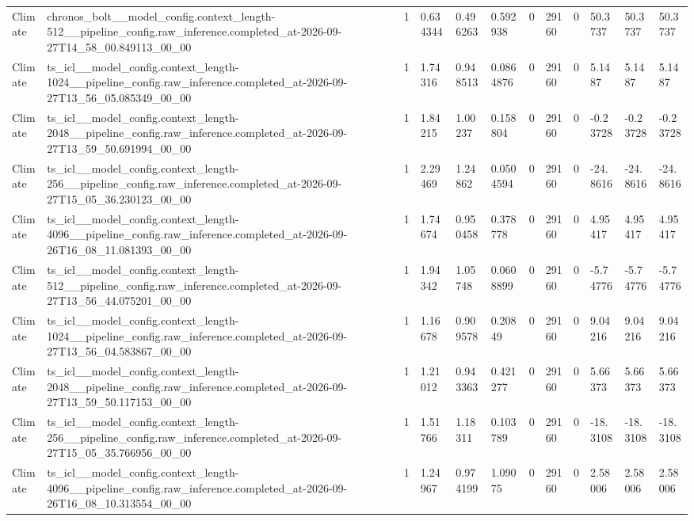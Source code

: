 \begin{tabular}{llllllllllll}
Climate & chronos\_bolt\_\_model\_config.context\_length-512\_\_pipeline\_config.raw\_inference.completed\_at-2026-09-27T14\_58\_00.849113\_00\_00 & 1 & 0.634344 & 0.496263 & 0.592938 & 0 & 29160 & 0 & 50.3737 & 50.3737 & 50.3737 \\
Climate & ts\_icl\_\_model\_config.context\_length-1024\_\_pipeline\_config.raw\_inference.completed\_at-2026-09-27T13\_56\_05.085349\_00\_00 & 1 & 1.74316 & 0.948513 & 0.0864876 & 0 & 29160 & 0 & 5.1487 & 5.1487 & 5.1487 \\
Climate & ts\_icl\_\_model\_config.context\_length-2048\_\_pipeline\_config.raw\_inference.completed\_at-2026-09-27T13\_59\_50.691994\_00\_00 & 1 & 1.84215 & 1.00237 & 0.158804 & 0 & 29160 & 0 & -0.23728 & -0.23728 & -0.23728 \\
Climate & ts\_icl\_\_model\_config.context\_length-256\_\_pipeline\_config.raw\_inference.completed\_at-2026-09-27T15\_05\_36.230123\_00\_00 & 1 & 2.29469 & 1.24862 & 0.0504594 & 0 & 29160 & 0 & -24.8616 & -24.8616 & -24.8616 \\
Climate & ts\_icl\_\_model\_config.context\_length-4096\_\_pipeline\_config.raw\_inference.completed\_at-2026-09-26T16\_08\_11.081393\_00\_00 & 1 & 1.74674 & 0.950458 & 0.378778 & 0 & 29160 & 0 & 4.95417 & 4.95417 & 4.95417 \\
Climate & ts\_icl\_\_model\_config.context\_length-512\_\_pipeline\_config.raw\_inference.completed\_at-2026-09-27T13\_56\_44.075201\_00\_00 & 1 & 1.94342 & 1.05748 & 0.0608899 & 0 & 29160 & 0 & -5.74776 & -5.74776 & -5.74776 \\
Climate & ts\_icl\_\_model\_config.context\_length-1024\_\_pipeline\_config.raw\_inference.completed\_at-2026-09-27T13\_56\_04.583867\_00\_00 & 1 & 1.16678 & 0.909578 & 0.20849 & 0 & 29160 & 0 & 9.04216 & 9.04216 & 9.04216 \\
Climate & ts\_icl\_\_model\_config.context\_length-2048\_\_pipeline\_config.raw\_inference.completed\_at-2026-09-27T13\_59\_50.117153\_00\_00 & 1 & 1.21012 & 0.943363 & 0.421277 & 0 & 29160 & 0 & 5.66373 & 5.66373 & 5.66373 \\
Climate & ts\_icl\_\_model\_config.context\_length-256\_\_pipeline\_config.raw\_inference.completed\_at-2026-09-27T15\_05\_35.766956\_00\_00 & 1 & 1.51766 & 1.18311 & 0.103789 & 0 & 29160 & 0 & -18.3108 & -18.3108 & -18.3108 \\
Climate & ts\_icl\_\_model\_config.context\_length-4096\_\_pipeline\_config.raw\_inference.completed\_at-2026-09-26T16\_08\_10.313554\_00\_00 & 1 & 1.24967 & 0.974199 & 1.09075 & 0 & 29160 & 0 & 2.58006 & 2.58006 & 2.58006 \\

\end{tabular}
